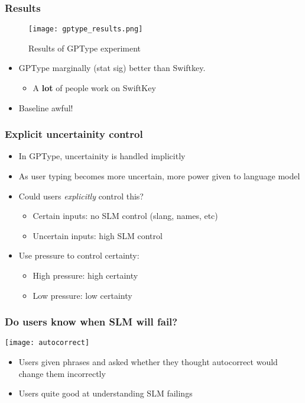 \begin{frame}
	\frametitle{Results}
	\begin{figure}[tbh]
		\centering\texttt{[image: gptype\_results.png]}
		\centering\caption{\label{fig:gptype_results}Results of GPType experiment}
	\end{figure}
	\begin{itemize}
		\item GPType marginally (stat sig) better than Swiftkey.
		\begin{itemize}
			\item A {\bf lot} of people work on SwiftKey
		\end{itemize}
		\item Baseline awful!
	\end{itemize}
\end{frame}

\begin{frame}
	\frametitle{Explicit uncertainity control}
	\begin{itemize}
		\item In GPType, uncertainity is handled implicitly
		\item As user typing becomes more uncertain, more power given to language model
		\item Could users \emph{explicitly} control this?
		\begin{itemize}
			\item Certain inputs: no \ac{SLM} control (slang, names, etc)
			\item Uncertain inputs: high \ac{SLM} control
		\end{itemize}
		\item Use pressure to control certainty:
		\begin{itemize}
			\item High pressure: high certainty
			\item Low pressure: low certainty
		\end{itemize}
	\end{itemize}
\end{frame}

\begin{frame}
	\frametitle{Do users know when \ac{SLM} will fail?}
	\centering\texttt{[image: autocorrect]}
	\begin{itemize}
		\item Users given phrases and asked whether they thought autocorrect would change them incorrectly
		\item Users quite good at understanding \ac{SLM} failings
	\end{itemize}
\end{frame}

